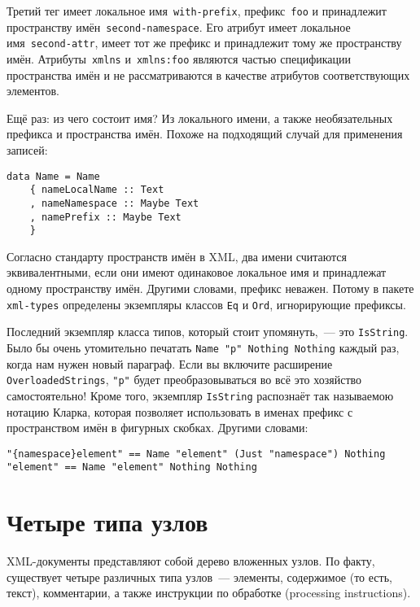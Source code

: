 Третий тег имеет локальное имя~\lstinline!with-prefix!, префикс~\lstinline!foo! и принадлежит пространству имён~\lstinline!second-namespace!. Его атрибут имеет локальное имя~\lstinline!second-attr!, имеет тот же префикс и принадлежит тому же пространству имён. Атрибуты~\lstinline!xmlns! и~\lstinline!xmlns:foo! являются частью спецификации пространства имён и не рассматриваются в качестве атрибутов соответствующих элементов.

Ещё раз: из чего состоит имя? Из локального имени, а также необязательных префикса и пространства имён. Похоже на подходящий случай для применения записей:
\begin{lstlisting}
data Name = Name
    { nameLocalName :: Text
    , nameNamespace :: Maybe Text
    , namePrefix :: Maybe Text
    }
\end{lstlisting}

Согласно стандарту пространств имён в XML, два имени считаются эквивалентными, если они имеют одинаковое локальное имя и принадлежат одному пространству имён. Другими словами, префикс неважен. Потому в пакете \lstinline!xml-types! определены экземпляры классов \lstinline!Eq! и \lstinline!Ord!, игнорирующие префиксы.

Последний экземпляр класса типов, который стоит упомянуть,~--- это \lstinline!IsString!. Было бы очень утомительно печатать \lstinline!Name "p" Nothing Nothing! каждый раз, когда нам нужен новый параграф. Если вы включите расширение \lstinline!OverloadedStrings!, \lstinline!"p"! будет преобразовываться во всё это хозяйство самостоятельно! Кроме того, экземпляр \lstinline!IsString! распознаёт так называемою нотацию Кларка, которая позволяет использовать в именах префикс с пространством имён в фигурных скобках. Другими словами:
\begin{lstlisting}
"{namespace}element" == Name "element" (Just "namespace") Nothing
"element" == Name "element" Nothing Nothing
\end{lstlisting}

\section{Четыре типа узлов} %
XML-документы представляют собой дерево вложенных узлов. По факту, существует четыре различных типа узлов~--- элементы, содержимое (то есть, текст), комментарии, а также инструкции по обработке (processing instructions).


